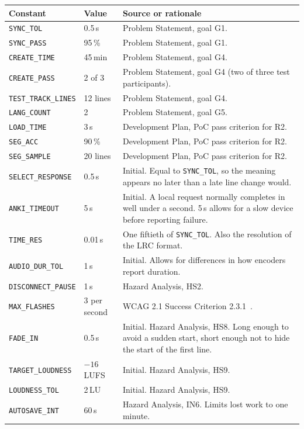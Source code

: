 \documentclass[12pt]{article}
\newcommand{\cn}[1]{\texttt{#1}}
\begin{document}
{\small
\begin{longtable}{@{}P{0.34\textwidth}P{0.15\textwidth}P{0.45\textwidth}@{}}
\toprule
\textbf{Constant} & \textbf{Value} & \textbf{Source or rationale}\\
\midrule
\endhead
\cn{SYNC\_TOL} & 0.5\,s & Problem Statement, goal G1.\\
\cn{SYNC\_PASS} & 95\,\% & Problem Statement, goal G1.\\
\cn{CREATE\_TIME} & 45\,min & Problem Statement, goal G4.\\
\cn{CREATE\_PASS} & 2 of 3 & Problem Statement, goal G4 (two of three test
participants).\\
\cn{TEST\_TRACK\_LINES} & 12 lines & Problem Statement, goal G4.\\
\cn{LANG\_COUNT} & 2 & Problem Statement, goal G5.\\
\cn{LOAD\_TIME} & 3\,s & Development Plan, PoC pass criterion for R2.\\
\cn{SEG\_ACC} & 90\,\% & Development Plan, PoC pass criterion for R2.\\
\cn{SEG\_SAMPLE} & 20 lines & Development Plan, PoC pass criterion for R2.\\
\cn{SELECT\_RESPONSE} & 0.5\,s & Initial. Equal to \cn{SYNC\_TOL}, so the
meaning appears no later than a late line change would.\\
\cn{ANKI\_TIMEOUT} & 5\,s & Initial. A local request normally completes in
well under a second. 5\,s allows for a slow device before reporting failure.\\
\cn{TIME\_RES} & 0.01\,s & One fiftieth of \cn{SYNC\_TOL}. Also the
resolution of the LRC format.\\
\cn{AUDIO\_DUR\_TOL} & 1\,s & Initial. Allows for differences in how
encoders report duration.\\
\cn{DISCONNECT\_PAUSE} & 1\,s & Hazard Analysis, HS2.\\
\cn{MAX\_FLASHES} & 3 per second & WCAG 2.1 Success Criterion
2.3.1~\cite{WCAG231}.\\
\cn{FADE\_IN} & 0.5\,s & Initial. Hazard Analysis, HS8. Long enough to avoid a
sudden start, short enough not to hide the start of the first line.\\
\cn{TARGET\_LOUDNESS} & $-16$\,LUFS & Initial. Hazard Analysis, HS9.\\
\cn{LOUDNESS\_TOL} & 2\,LU & Initial. Hazard Analysis, HS9.\\
\cn{AUTOSAVE\_INT} & 60\,s & Hazard Analysis, IN6. Limits lost work to one
minute.\\

\end{longtable}}
\end{document}
